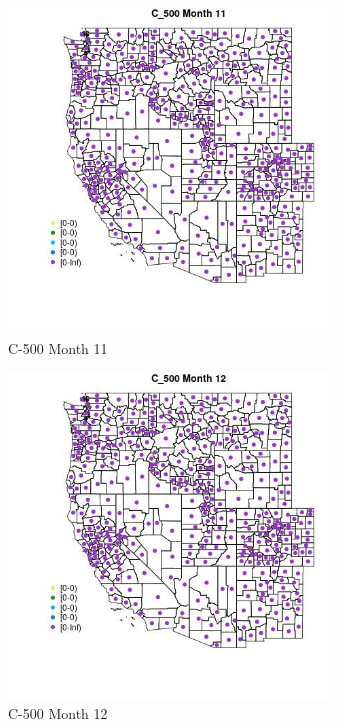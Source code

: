 \begin{figure} 
\centering  
\includegraphics[width=0.77\textwidth]{Code_Outputs/df_report_ML_predictors_CountyCentroid_Locations_Dates_2008-01-01to2018-12-31_MapObsMo11C_500.jpg} 
\caption{\label{fig:df_report_ML_predictors_CountyCentroid_Locations_Dates_2008-01-01to2018-12-31MapObsMo11C_500}C-500 Month 11} 
\end{figure} 
 

\begin{figure} 
\centering  
\includegraphics[width=0.77\textwidth]{Code_Outputs/df_report_ML_predictors_CountyCentroid_Locations_Dates_2008-01-01to2018-12-31_MapObsMo12C_500.jpg} 
\caption{\label{fig:df_report_ML_predictors_CountyCentroid_Locations_Dates_2008-01-01to2018-12-31MapObsMo12C_500}C-500 Month 12} 
\end{figure} 
 

